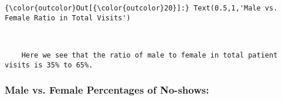 \documentclass[11pt]{article}
\begin{document}
\begin{Verbatim}[commandchars=\\\{\}]
{\color{outcolor}Out[{\color{outcolor}20}]:} Text(0.5,1,'Male vs. Female Ratio in Total Visits')
\end{Verbatim}
            
    \begin{center}
    \end{center}
    { \hspace*{\fill} \\}
    
    \begin{verbatim}
    Here we see that the ratio of male to female in total patient visits is 35% to 65%. 
\end{verbatim}

    \subsubsection{Male vs. Female Percentages of
No-shows:}\label{male-vs.-female-percentages-of-no-shows}
\end{document}
